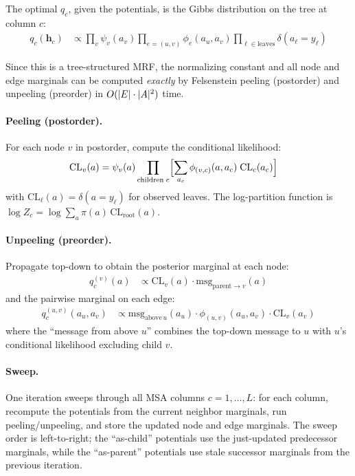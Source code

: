 The optimal $q_c$, given the potentials, is the Gibbs distribution on the
tree at column $c$:
\begin{align}
q_c(\mathbf{h}_c) &\propto \prod_v \psi_v(a_v) \prod_{e=(u,v)} \phi_e(a_u, a_v)
  \prod_{\ell \in \mathrm{leaves}} \delta(a_\ell = y_\ell)
\label{eq:q-gibbs}
\end{align}

Since this is a tree-structured MRF, the normalizing constant and all
node and edge marginals can be computed \emph{exactly} by Felsenstein
peeling (postorder) and unpeeling (preorder) in $O(|E| \cdot |A|^2)$ time.

\paragraph{Peeling (postorder).}
For each node $v$ in postorder, compute the conditional likelihood:
\begin{align}
\mathrm{CL}_v(a) &= \psi_v(a) \prod_{\mathrm{children}\; c}
  \Bigl[\sum_{a_c} \phi_{(v,c)}(a, a_c)\; \mathrm{CL}_c(a_c)\Bigr]
\label{eq:peel}
\end{align}
with $\mathrm{CL}_\ell(a) = \delta(a = y_\ell)$ for observed leaves.
The log-partition function is $\log Z_c = \log \sum_a \pi(a)\, \mathrm{CL}_{\mathrm{root}}(a)$.

\paragraph{Unpeeling (preorder).}
Propagate top-down to obtain the posterior marginal at each node:
\begin{align}
q_c^{(v)}(a) &\propto \mathrm{CL}_v(a) \cdot \mathrm{msg}_{\mathrm{parent} \to v}(a)
\label{eq:unpeel-marginal}
\end{align}
and the pairwise marginal on each edge:
\begin{align}
q_c^{(u,v)}(a_u, a_v)
 &\propto \mathrm{msg}_{\mathrm{above}\,u}(a_u) \cdot \phi_{(u,v)}(a_u, a_v) \cdot \mathrm{CL}_v(a_v)
\label{eq:unpeel-pair}
\end{align}
where the ``message from above $u$'' combines the top-down message to $u$
with $u$'s conditional likelihood excluding child $v$.

\paragraph{Sweep.}
One iteration sweeps through all MSA columns $c = 1, \ldots, L$:
for each column, recompute the potentials from the current neighbor marginals,
run peeling/unpeeling, and store the updated node and edge marginals.
The sweep order is left-to-right; the ``as-child'' potentials use the
just-updated predecessor marginals, while the ``as-parent'' potentials
use stale successor marginals from the previous iteration.

